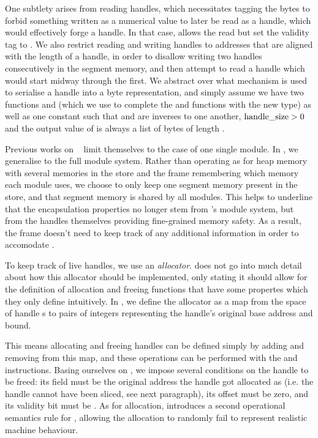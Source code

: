\documentclass[acmsmall,screen]{acmart}\settopmatter{}
\begin{document}
One subtlety arises from reading handles, which necessitates tagging the bytes to forbid something written as a numerical value to later be read as a handle, which would effectively forge a handle. In that case, \mswasm allows the read but set the validity tag to \xxCfalse. We also restrict reading and writing handles to addresses that are aligned with the length of a handle, in order to disallow writing two handles consecutively in the segment memory, and then attempt to read a handle which would start midway through the first. We abstract over what mechanism is used to serialise a handle into a byte representation, and simply assume we have two functions \xxWserialisehandle and \xxWdeserialisehandle (which we use to complete the \xxWserialise and \xxWdeserialise functions with the new \xxWhandle type) as well as one constant \xxWhandlesize such that \xxWserialisehandle and \xxWdeserialisehandle are inverses to one another, \( \mathrm{handle\_size} > 0 \) and the output value of \xxWserialisehandle is always a list of bytes of length \xxWhandlesize.

Previous works on \mswasm~\cite{mswasm} limit themselves to the case of one single module. In \irismswasm, we generalise to the full module system. Rather than operating as for heap memory with several memories in the store and the frame remembering which memory each module uses, we choose to only keep one segment memory present in the store, and that segment memory is shared by all modules. This helps to underline that the encapsulation properties no longer stem from \wasm's module system, but from the handles themselves providing fine-grained memory safety. As a result, the frame doesn't need to keep track of any additional information in order to accomodate \mswasm.

To keep track of live handles, we use an \emph{allocator}. \citet{mswasm} does not go into much detail about how this allocator should be implemented, only stating it should allow for the definition of allocation and freeing functions that have some propertes which they only define intuitively. In \irismswasm, we define the allocator as a map from the space of handle \xxWid{}s to pairs of integers representing the handle's original base address and bound.

This means allocating and freeing handles can be defined simply by adding and removing from this map, and these operations can be performed with the \xxWsegalloc and \xxWsegfree instructions. Basing ourselves on \citet{mswasm}, we impose several conditions on the handle to be freed: its  field must be the original address the handle got allocated as (i.e. the handle cannot have been sliced, see next paragraph), its offset must be zero, and its validity bit must be \xxCtrue. As for allocation, \irismswasm introduces a second operational semantics rule for \xxWsegalloc, allowing the allocation to randomly fail to represent realistic machine behaviour.
\end{document}
